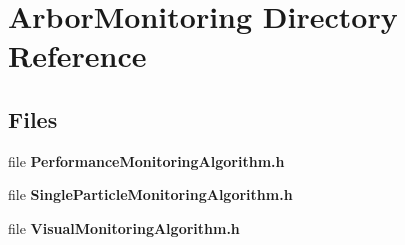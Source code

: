 \section{Arbor\+Monitoring Directory Reference}
\label{dir_a6928605f93b98c2958db4b452940310}
\subsection*{Files}
\begin{DoxyCompactItemize}
\item 
file {\bf Performance\+Monitoring\+Algorithm.\+h}
\item 
file {\bf Single\+Particle\+Monitoring\+Algorithm.\+h}
\item 
file {\bf Visual\+Monitoring\+Algorithm.\+h}
\end{DoxyCompactItemize}
